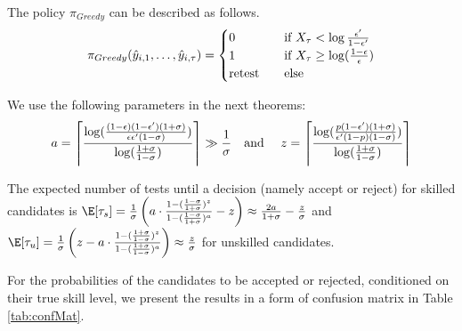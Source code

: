 \begin{corollary}\label{cor:piGreedy}
The policy $\pi_{Greedy}$ can be described as follows.
\[
\pi_{Greedy}(\hat{y}_{i,1},\dots,\hat{y}_{i,\tau})=
 \begin{cases}
       0     &\quad\text{if } X_{\tau} < \log \frac{\epsilon'}{1-\epsilon'} \\
       1    &\quad\text{if } X_{\tau}\geq \log(\frac{1-\epsilon}{\epsilon})\\
       \textnormal{retest}    &\quad\textnormal{else}\\
     \end{cases}
\]
\end{corollary} 

\noindent We use the following parameters in the next theorems: 
$$a=\left\lceil \frac{\log(\frac{(1-\epsilon)(1-\epsilon')(1+\sigma)}{\epsilon \epsilon'(1-\sigma)})}{\log(\frac{1+\sigma}{1-\sigma})}\right\rceil \gg \frac{1}{\sigma}
\text{\quad and \quad} z=
\left\lceil\frac{\log (\frac{p(1-\epsilon')(1+\sigma)}{\epsilon'(1-p)(1-\sigma)})}{\log(\frac{1+\sigma}{1-\sigma})}\right\rceil$$
\begin{theorem}\label{thm:expectedNumOfTests}
The expected number of tests until a decision 
(namely accept or reject) for skilled candidates is $\E[\tau_{s}]=\frac{1}{\sigma}\left(a\cdot\frac{1-(\frac{1-\sigma}{1+\sigma})^{z}}{1-(\frac{1-\sigma}{1+\sigma})^{a}}-z\right)\approx\frac{2a}{1+\sigma}-\frac{z}{\sigma}$ and $\E[\tau_{u}]=\frac{1}{\sigma}\left(z-a\cdot\frac{1-(\frac{1+\sigma}{1-\sigma})^{z}}{1-(\frac{1+\sigma}{1-\sigma})^{a}}\right)\approx\frac{z}{\sigma}$ for unskilled candidates.
\end{theorem} 
For the probabilities of the candidates to be accepted or rejected, 
conditioned on their true skill level, 
we present the results in a form of confusion matrix in Table \ref{tab:confMat}. 


